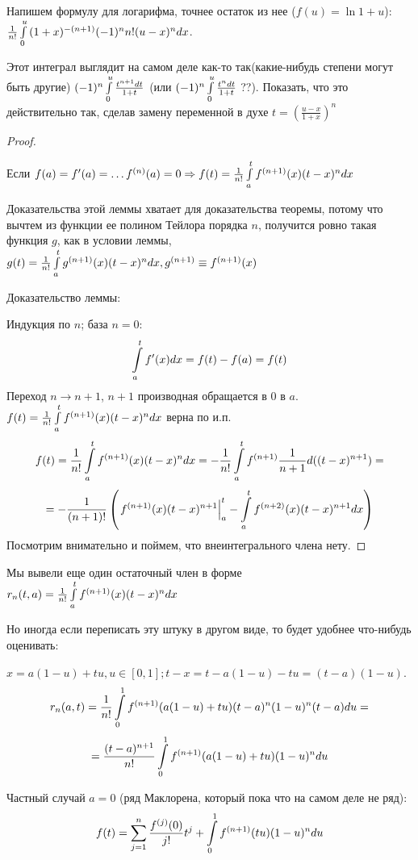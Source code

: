 \documentclass[12pt]{report}
\begin{document}
\begin{note}[2]
Напишем формулу для логарифма, точнее остаток из нее ($f(u) = \ln{1 + u}$):
$\frac{1}{n!}\int\limits_0^u{(1 + x)^{-(n + 1)}(-1)^n n!(u - x)^n dx}$.

\begin{probl}
Этот интеграл выглядит на самом деле как-то так(какие-нибудь степени могут быть другие) $(-1)^n\int\limits_0^u{\frac{t^{n + 1}dt}{1 + t}}$ (или $(-1)^n\int\limits_0^u{\frac{t^ndt}{1 + t}}$ ??). Показать, что это действительно так, сделав замену переменной в духе $t = \left(\frac{u - x}{1 + x}\right)^n$
\end{probl}
\end{note}

\begin{proof}
\begin{lm}
Если $f(a) = f'(a) = \dots f^{(n)}(a) = 0 \Rightarrow f(t) = \frac{1}{n!}\int\limits_a^t{f^{(n + 1)}(x)(t - x)^n dx}$
\end{lm}

Доказательства этой леммы хватает для доказательства теоремы, потому что вычтем из функции ее полином Тейлора порядка $n$, получится ровно такая функция $g$, как в условии леммы, $g(t) = \frac{1}{n!}\int\limits_a^t{g^{(n + 1)}(x)(t - x)^ndx}, g^{(n + 1)} \equiv f^{(n + 1)}(x)$

Доказательство леммы:

Индукция по $n$; база $n = 0$:
$$\int\limits_a^t{f'(x)dx} = f(t) - f(a) = f(t)$$
Переход $n \to n + 1$, $n + 1$ производная обращается в $0$ в $a$. $f(t) = \frac{1}{n!}\int\limits_a^t{f^{(n + 1)}(x)(t - x)^ndx}$ верна по и.п. 
$$f(t) = \frac{1}{n!}\int\limits_a^t{f^{(n + 1)}(x)(t - x)^ndx} = -\frac{1}{n!}\int\limits_a^t{f^{(n + 1)}\frac{1}{n + 1}d((t - x)^{n + 1})} =$$ 
$$= -\frac{1}{(n + 1)!}\left(\left.f^{(n + 1)}(x)(t - x)^{n + 1}\right|_a^t - \int\limits_a^t{f^{(n + 2)}(x)(t - x)^{n + 1}dx}\right)$$
Посмотрим внимательно и поймем, что внеинтегрального члена нету.
\end{proof}

\begin{rem}
Мы вывели еще один остаточный член в форме $r_n(t, a) = \frac{1}{n!}\int\limits_a^t{f^{(n + 1)}(x)(t - x)^ndx}$

Но иногда если переписать эту штуку в другом виде, то будет удобнее что-нибудь оценивать: 

$x = a(1 - u) + tu, u \in [0, 1]; t - x = t - a(1 - u) - tu = (t - a)(1 - u)$.
$$r_n(a, t) = \frac{1}{n!}\int\limits_0^1{f^{(n + 1)}(a(1 - u) + tu)(t - a)^n(1 - u)^n(t - a)du} = $$ 
$$ = \frac{(t - a)^{n + 1}}{n!}\int\limits_0^1{f^{(n + 1)}(a(1 - u) + tu)(1 - u)^n du}$$

Частный случай $a = 0$ (ряд Маклорена, который пока что на самом деле не ряд):
$$f(t) = \sum\limits_{j = 1}^n{\frac{f^{(j)}(0)}{j!}t^j} + \int\limits_0^1{f^{(n + 1)}(tu)(1 - u)^n du}$$
\end{rem}
\end{document}
